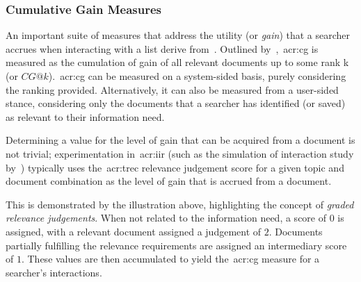 \subsubsection{Cumulative Gain Measures}
An important suite of measures that address the utility (or \emph{gain}) that a searcher accrues when interacting with a list derive from~. Outlined by~\cite{jarvelin2000cg, jarvelin2002cg},~\gls{acr:cg} is measured as the cumulation of gain of all relevant documents up to some rank k (or $CG@k$).~\gls{acr:cg} can be measured on a system-sided basis, purely considering the ranking provided. Alternatively, it can also be measured from a user-sided stance, considering only the documents that a searcher has identified (or saved) as relevant to their information need.

Determining a value for the level of gain that can be acquired from a document is not trivial; experimentation in~\gls{acr:iir} (such as the simulation of interaction study by~\cite{pakkonen2015behavioural_dimensions}) typically uses the~\gls{acr:trec} relevance judgement score for a given topic and document combination as the level of gain that is accrued from a document.

\vspace{5mm}
\begin{figure}[h!]
    \centering
    \label{fig:graded}
\end{figure}

This is demonstrated by the illustration above, highlighting the concept of \emph{graded relevance judgements}. When not related to the information need, a score of $0$ is assigned, with a relevant document assigned a judgement of $2$. Documents partially fulfilling the relevance requirements are assigned an intermediary score of $1$. These values are then accumulated to yield the~\gls{acr:cg} measure for a searcher's interactions.

